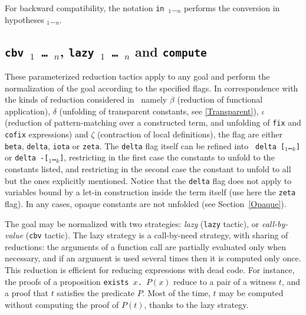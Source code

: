 For backward compatibility, the notation \texttt{in}~{\ident}$_1$\ldots {\ident}$_n$
performs the conversion in hypotheses {\ident}$_1$\ldots {\ident}$_n$.


\subsection[{\tt cbv \flag$_1$ \dots\ \flag$_n$}, {\tt lazy \flag$_1$
\dots\ \flag$_n$} and {\tt compute}]
{{\tt cbv \flag$_1$ \dots\ \flag$_n$}, {\tt lazy \flag$_1$
\dots\ \flag$_n$} and {\tt compute}
\label{vmcompute}}

These parameterized reduction tactics apply to any goal and perform
the normalization of the goal according to the specified flags. In
correspondence with the kinds of reduction considered in \Coq\, namely
$\beta$ (reduction of functional application), $\delta$ (unfolding of
transparent constants, see \ref{Transparent}), $\iota$ (reduction of
pattern-matching over a constructed term, and unfolding of {\tt fix}
and {\tt cofix} expressions) and $\zeta$ (contraction of local
definitions), the flag are either {\tt beta}, {\tt delta}, {\tt iota}
or {\tt zeta}. The {\tt delta} flag itself can be refined into {\tt
delta [\qualid$_1$\ldots\qualid$_k$]} or {\tt delta
-[\qualid$_1$\ldots\qualid$_k$]}, restricting in the first case the
constants to unfold to the constants listed, and restricting in the
second case the constant to unfold to all but the ones explicitly
mentioned. Notice that the {\tt delta} flag does not apply to
variables bound by a let-in construction inside the term itself (use
here the {\tt zeta} flag). In any cases, opaque constants are not
unfolded (see Section~\ref{Opaque}).

The goal may be normalized with two strategies: {\em lazy} ({\tt lazy}
tactic), or {\em call-by-value} ({\tt cbv} tactic). The lazy strategy
is a call-by-need strategy, with sharing of reductions: the arguments of a
function call are partially evaluated only when necessary, and if an
argument is used several times then it is computed only once. This
reduction is efficient for reducing expressions with dead code. For
instance, the proofs of a proposition {\tt exists~$x$. $P(x)$} reduce to a
pair of a witness $t$, and a proof that $t$ satisfies the predicate
$P$. Most of the time, $t$ may be computed without computing the proof
of $P(t)$, thanks to the lazy strategy.

